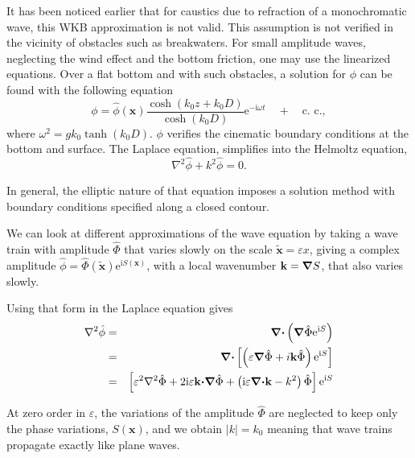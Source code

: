 It has been noticed earlier that for caustics due to refraction 
of a monochromatic wave, this WKB approximation is not valid. This assumption
is not verified in the vicinity of obstacles such as breakwaters.
For small amplitude waves, neglecting the wind effect and the bottom friction,
one may use the linearized equations. Over a flat bottom and with such obstacles,
a solution for $\phi$ can be found with the following equation
\begin{equation}
    \phi=\hat{\phi}({\mathbf x})\frac{\cosh\left(k_0 z+k_0 D\right)}{\cosh\left(k_0 D\right)}
     \mathrm{e}^{-\mathrm{i}\omega t}\quad +\quad \mbox{c. c.},
\end{equation}
where $\omega^2=gk_0 \tanh\left(k_0 D\right)$. $\phi$ verifies the cinematic
boundary conditions at the bottom and surface. The Laplace equation, simplifies
into the Helmoltz equation,
\begin{equation}
    \nabla^2 \hat{\phi}+k^2 \hat{\phi}=0.
\end{equation}

In general, the elliptic nature of that equation imposes a solution method
with boundary conditions specified along a closed contour. 

We can look at different approximations of the wave equation by taking a wave train with amplitude $\hat{\Phi}$ that varies slowly 
on the scale $\widetilde{\mathbf
x}=\varepsilon x$, giving a complex amplitude $\hat{\phi}=\hat{\Phi}\left(\widetilde{\mathbf
x}\right)\mathrm{e}^{\mathrm{i}S\left({\mathbf x}\right)}$, with a local wavenumber  ${\mathbf k}=\mbox{\boldmath $\nabla$} S$, 
that also varies slowly.  

Using that form in the Laplace equation gives
\begin{eqnarray}
    \nabla^2 \hat{\phi} & = & \mbox{\boldmath $\nabla$} \mbox{\boldmath $\cdot$}
    \left(\mbox{\boldmath $\nabla$} \hat{\Phi}\mathrm{e}^{\mathrm{i}S}\right)\\
    & = & \mbox{\boldmath $\nabla$} \mbox{\boldmath $\cdot$} \left[
    \left( \varepsilon \mbox{\boldmath $\nabla$} \hat{\Phi} + i{\mathbf k}\hat{\Phi}\right)
    \mathrm{e}^{\mathrm{i}S} \right]\\
    & = &  \left[\varepsilon^2 \nabla^2 \hat{\Phi}
    + 2\mathrm{i} \varepsilon {\mathbf k}\mbox{\boldmath $\cdot$} \mbox{\boldmath $\nabla$} \hat{\Phi}
    +\left(\mathrm{i} \varepsilon \mbox{\boldmath $\nabla$} \mbox{\boldmath $\cdot$} {\mathbf k}-k^2\right)\hat{\Phi}
     \right]\mathrm{e}^{\mathrm{i}S}\\
\end{eqnarray}

At zero order in $\varepsilon$, the variations of the amplitude
$\hat{\Phi}$ are neglected to keep only the phase variations,  $S\left({\mathbf x}\right)$,
and we obtain $\left|k\right|=k_0$ meaning that  wave trains propagate exactly like plane waves.

